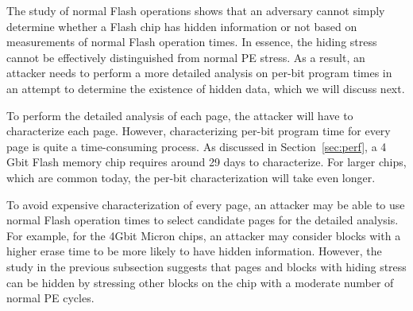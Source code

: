 
The study of normal Flash operations shows that an adversary cannot simply determine
whether a Flash chip has hidden information or not based on measurements of normal 
Flash operation times. In essence, the hiding stress cannot be effectively distinguished 
from normal PE stress. As a result, an attacker needs to perform a more detailed
analysis on per-bit program times in an attempt 
to determine the existence of hidden data, which we will discuss next.

To perform the detailed analysis of each page, the attacker will have to
characterize each page. However, characterizing per-bit program time for every page is 
quite a time-consuming process. As discussed in 
Section~\ref{sec:perf}, a 4 Gbit Flash memory chip requires around 29 
days to characterize. For larger chips, which are common today, the per-bit characterization
will take even longer. 

To avoid expensive characterization of every page, an attacker may be able to use
normal Flash operation times to select candidate pages for the detailed analysis.
For example, for the 4Gbit Micron chips, an attacker 
may consider blocks with a higher erase time to be more likely to have hidden information.
However, the study in the previous subsection suggests that pages and blocks with hiding
stress can be hidden by stressing other blocks on the chip with a moderate number of normal PE 
cycles. 

